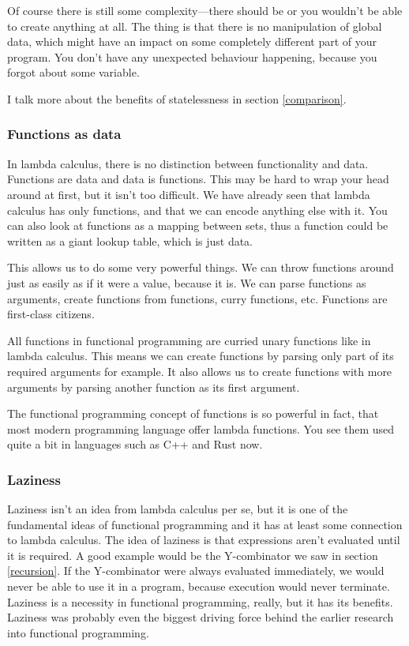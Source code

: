 \documentclass[11pt]{article}
\begin{document}
Of course there is still some complexity---there should be or you wouldn't be
able to create anything at all. The thing is that there is no manipulation of
global data, which might have an impact on some completely different part of
your program. You don't have any unexpected behaviour happening, because you
forgot about some variable.

I talk more about the benefits of statelessness in section \ref{comparison}.

\subsubsection{Functions as data}

In lambda calculus, there is no distinction between functionality and data.
Functions are data and data is functions. This may be hard to wrap your head
around at first, but it isn't too difficult. We have already seen that lambda
calculus has only functions, and that we can encode anything else with it. You
can also look at functions as a mapping between sets, thus a function could be
written as a giant lookup table, which is just data.

This allows us to do some very powerful things. We can throw functions around
just as easily as if it were a value, because it is. We can parse functions as
arguments, create functions from functions, curry functions, etc. Functions are
first-class citizens.

All functions in functional programming are curried unary functions like in
lambda calculus. This means we can create functions by parsing only part of its
required arguments for example. It also allows us to create functions with more
arguments by parsing another function as its first argument.

The functional programming concept of functions is so powerful in fact, that
most modern programming language offer lambda functions. You see them used
quite a bit in languages such as C++ and Rust now.

\subsubsection{Laziness}\label{laziness}

Laziness isn't an idea from lambda calculus per se, but it is one of the
fundamental ideas of functional programming and it has at least some connection
to lambda calculus. The idea of laziness is that expressions aren't evaluated
until it is required. A good example would be the Y-combinator we saw in
section \ref{recursion}. If the Y-combinator were always evaluated immediately,
we would never be able to use it in a program, because execution would never
terminate. Laziness is a necessity in functional programming, really, but it
has its benefits. Laziness was probably even the biggest driving force behind
the earlier research into functional programming.
\end{document}

